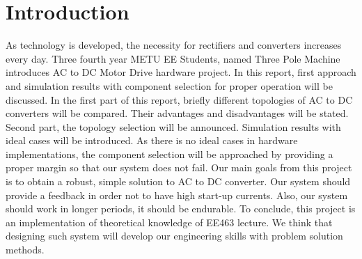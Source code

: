 
\section{Introduction}

As technology is developed, the necessity for rectifiers and converters increases every day. Three fourth year METU EE Students, named Three Pole Machine introduces AC to DC Motor Drive hardware project. In this report, first approach and simulation results with component selection for proper operation will be discussed. In the first part of this report, briefly different topologies of AC to DC converters will be compared. Their advantages and disadvantages will be stated. Second part, the topology selection will be announced. Simulation results with ideal cases will be introduced. As there is no ideal cases in hardware implementations, the component selection will be approached by providing a proper margin so that our system does not fail. Our main goals from this project is to obtain a robust, simple solution to AC to DC converter. Our system should provide a feedback in order not to have high start-up currents. Also, our system should work in longer periods, it should be endurable. To conclude, this project is an implementation of theoretical knowledge of EE463 lecture. We think that designing such system will develop our engineering skills with problem solution methods.